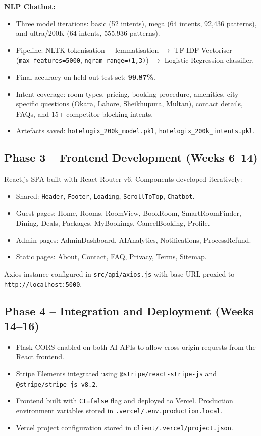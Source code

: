 \documentclass[12pt,a4paper]{report}
\begin{document}
\textbf{NLP Chatbot:}
\begin{itemize}[leftmargin=*, label=\textbullet]
  \item Three model iterations: basic (52 intents), mega (64 intents, 92,436 patterns), and ultra/200K (64 intents, 555,936 patterns).
  \item Pipeline: NLTK tokenisation + lemmatisation $\rightarrow$ TF-IDF Vectoriser (\texttt{max\_features=5000}, \texttt{ngram\_range=(1,3)}) $\rightarrow$ Logistic Regression classifier.
  \item Final accuracy on held-out test set: \textbf{99.87\%}.
  \item Intent coverage: room types, pricing, booking procedure, amenities, city-specific questions (Okara, Lahore, Sheikhupura, Multan), contact details, FAQs, and 15+ competitor-blocking intents.
  \item Artefacts saved: \texttt{hotelogix\_200k\_model.pkl}, \texttt{hotelogix\_200k\_intents.pkl}.
\end{itemize}

\subsection*{Phase 3 -- Frontend Development (Weeks 6--14)}
React.js SPA built with React Router v6. Components developed iteratively:
\begin{itemize}[leftmargin=*, label=\textbullet]
  \item Shared: \texttt{Header}, \texttt{Footer}, \texttt{Loading}, \texttt{ScrollToTop}, \texttt{Chatbot}.
  \item Guest pages: Home, Rooms, RoomView, BookRoom, SmartRoomFinder, Dining, Deals, Packages, MyBookings, CancelBooking, Profile.
  \item Admin pages: AdminDashboard, AIAnalytics, Notifications, ProcessRefund.
  \item Static pages: About, Contact, FAQ, Privacy, Terms, Sitemap.
\end{itemize}
Axios instance configured in \texttt{src/api/axios.js} with base URL proxied to \texttt{http://localhost:5000}.

\subsection*{Phase 4 -- Integration and Deployment (Weeks 14--16)}
\begin{itemize}[leftmargin=*, label=\textbullet]
  \item Flask CORS enabled on both AI APIs to allow cross-origin requests from the React frontend.
  \item Stripe Elements integrated using \texttt{@stripe/react-stripe-js} and \texttt{@stripe/stripe-js v8.2}.
  \item Frontend built with \texttt{CI=false} flag and deployed to Vercel. Production environment variables stored in \texttt{.vercel/.env.production.local}.
  \item Vercel project configuration stored in \texttt{client/.vercel/project.json}.
\end{itemize}
\end{document}
